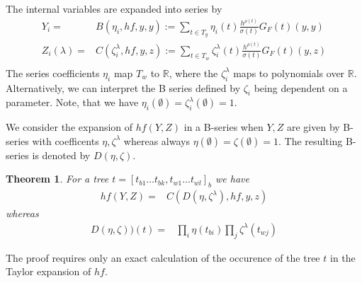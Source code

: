 \documentclass[english,unicode]{article}
\newcommand{\real}{\mathbb{R}}
\newtheorem{satz}{Theorem}[section]
\begin{document}
The internal variables are expanded into series by
\begin{align}
Y_i=&B(\eta_i,hf,y,y):=\sum_{t\in T_y} \eta_i(t) \frac{h^{\rho(t)}}{\sigma(t)}G_F(t)(y,y)\\
Z_i(\lambda)=&C(\zeta^{\lambda}_i,hf,y,z):=\sum_{t\in T_w} \zeta^{\lambda}_i(t) \frac{h^{\rho(t)}}{\sigma(t)} G_F(t)(y,z)\\
\end{align}
The series coefficients $\eta_i$  map $T_w$ to $\real$, where the $\zeta_i^{\lambda}$ maps to polynomials over $\real$. Alternatively, we can interpret the B series defined by $\zeta_i$ being dependent on a parameter.
Note, that we have $\eta_i(\emptyset)=\zeta_i^{\lambda}(\emptyset)=1$.  
 
 We consider the expansion of $hf(Y,Z)$ in a B-series when $Y, Z$ are given by B-series with coefficents $\eta, \zeta^{\lambda}$ whereas always $\eta(\emptyset)=\zeta(\emptyset)=1$.
The resulting B-series is denoted by $D(\eta,\zeta)$.
\begin{satz}
For a tree $t= [t_{b1}\ldots t_{bk},t_{w1}\ldots t_{wl}]_b$ we have
\begin{align}
hf(Y,Z)=&C(D(\eta, \zeta^{\lambda}),hf,y,z)
\end{align}
whereas 
\begin{align}
D(\eta, \zeta))(t)=&\prod_i \eta(t_{bi}) \prod_j \zeta^{\lambda}(t_{wj})
\end{align}
\end{satz}
The proof requires only an exact calculation of the occurence of the tree $t$ in the Taylor expansion of $hf$.
\end{document}
